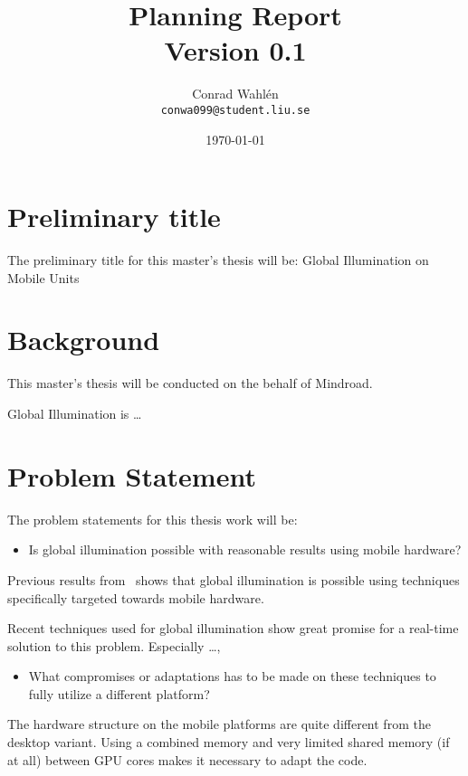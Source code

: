 \documentclass[a4paper, 12pt]{article}
\title{Planning Report \\ \small{Version 0.1}}
\author{Conrad Wahlén \\ \texttt{conwa099@student.liu.se}}
\date{\today}
\begin{document}
\maketitle
\thispagestyle{empty}
\newpage


\section{Preliminary title}
\label{sec:Preliminary title}

The preliminary title for this master's thesis will be:
Global Illumination on Mobile Units

\section{Background}
\label{sec:Background}

This master's thesis will be conducted on the behalf of Mindroad.

Global Illumination is \ldots

\section{Problem Statement}
\label{sec:Problem Statement}

The problem statements for this thesis work will be:

\begin{itemize}
  \item Is global illumination possible with reasonable results using mobile hardware?
\end{itemize}

Previous results from~\cite{globalillusamsung} shows that global illumination is possible using techniques specifically targeted towards mobile hardware.

Recent techniques used for global illumination show great promise for a real-time solution to this problem. Especially \ldots,

\begin{itemize}
  \item What compromises or adaptations has to be made on these techniques to fully utilize a different platform?
\end{itemize}

The hardware structure on the mobile platforms are quite different from the desktop variant. Using a combined memory and very limited shared memory (if at all) between GPU cores makes it necessary to adapt the code.
\end{document}
